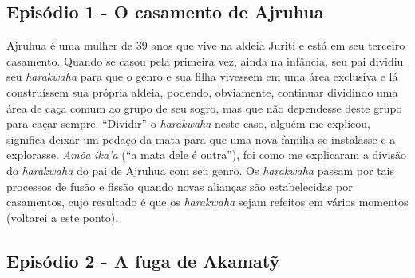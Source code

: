 \subsection{Episódio 1 - O casamento de Ajruhua}

\forceindent Ajruhua é uma mulher de 39 anos que vive na aldeia Juriti e está em seu
terceiro casamento. Quando se casou pela primeira vez, ainda na
infância, seu pai dividiu seu \emph{harakwaha} para que o genro e sua
filha vivessem em uma área exclusiva e lá construíssem sua própria
aldeia, podendo, obviamente, continuar dividindo uma área de caça comum
ao grupo de seu sogro, mas que não dependesse deste grupo para caçar
sempre. ``Dividir'' o \emph{harakwaha} neste caso, alguém me explicou,
significa deixar um pedaço da mata para que uma nova família se
instalasse e a explorasse. \emph{Amõa ika'a} (``a mata dele é outra''),
foi como me explicaram a divisão do \emph{harakwaha} do pai de Ajruhua
com seu genro. Os \emph{harakwaha} passam por tais processos de fusão e
fissão quando novas alianças são estabelecidas por casamentos, cujo
resultado é que os \emph{harakwaha} sejam refeitos em vários momentos
(voltarei a este ponto).

\subsection{Episódio 2 - A fuga de Akamatỹ}

